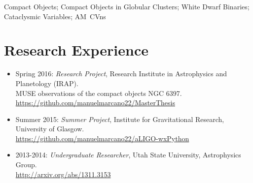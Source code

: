 \documentclass[letterpaper,10pt]{article}
\begin{document}
Compact Objects; Compact Objects in Globular Clusters; White Dwarf Binaries; Cataclysmic Variables; AM~CVns





\section*{Research Experience}




\begin{itemize}[label=$\blacktriangleright$]
        \item Spring 2016: \emph{Research Project}, Research Institute in Astrophysics and Planetology (IRAP).\\
                MUSE observations of the compact objects NGC 6397. \url{https://github.com/manuelmarcano22/MasterThesis} 
                
\end{itemize}
                



\begin{itemize}[label=$\blacktriangleright$]
\item Summer 2015: \emph{Summer Project}, Institute for Gravitational Research, University of Glasgow.\\
\url{https://github.com/manuelmarcano22/aLIGO-wxPython}
\end{itemize}



\begin{itemize}[label=$\blacktriangleright$]
  \item 2013-2014: \emph{Undergraduate Researcher}, Utah State University, Astrophysics Group.  \\
  \url{http://arxiv.org/abs/1311.3153}
  \end{itemize}
\end{document}
